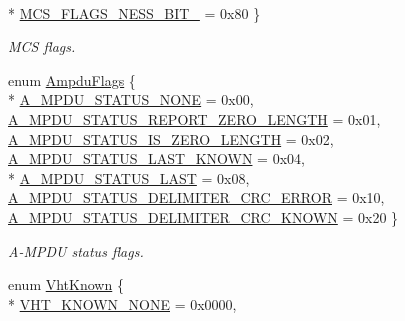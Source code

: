 \begin{DoxyCompactItemize}
\\*
\hyperlink{classns3_1_1RadiotapHeader_a81a58a7c4281df7ce21fb72c5ed181c3a423ea5081ba934fb09932a665e19328e}{M\+C\+S\+\_\+\+F\+L\+A\+G\+S\+\_\+\+N\+E\+S\+S\+\_\+\+B\+I\+T\+\_} = 0x80
 \}\begin{DoxyCompactList}\small\item\em M\+CS flags. \end{DoxyCompactList}
\item 
enum \hyperlink{classns3_1_1RadiotapHeader_a9f8333ba19c8dc9ae63e7e03af87a557}{Ampdu\+Flags} \{ \\*
\hyperlink{classns3_1_1RadiotapHeader_a9f8333ba19c8dc9ae63e7e03af87a557a223cc9f40442a69cce17a841b7c750dc}{A\+\_\+\+M\+P\+D\+U\+\_\+\+S\+T\+A\+T\+U\+S\+\_\+\+N\+O\+NE} = 0x00, 
\hyperlink{classns3_1_1RadiotapHeader_a9f8333ba19c8dc9ae63e7e03af87a557a32af8934a9f8eae371406fe449712487}{A\+\_\+\+M\+P\+D\+U\+\_\+\+S\+T\+A\+T\+U\+S\+\_\+\+R\+E\+P\+O\+R\+T\+\_\+\+Z\+E\+R\+O\+\_\+\+L\+E\+N\+G\+TH} = 0x01, 
\hyperlink{classns3_1_1RadiotapHeader_a9f8333ba19c8dc9ae63e7e03af87a557a0b1a6558b9b8829c7dec7f3dcd223968}{A\+\_\+\+M\+P\+D\+U\+\_\+\+S\+T\+A\+T\+U\+S\+\_\+\+I\+S\+\_\+\+Z\+E\+R\+O\+\_\+\+L\+E\+N\+G\+TH} = 0x02, 
\hyperlink{classns3_1_1RadiotapHeader_a9f8333ba19c8dc9ae63e7e03af87a557ad9c553bb630ebec01fc4cfe8ff68ec9a}{A\+\_\+\+M\+P\+D\+U\+\_\+\+S\+T\+A\+T\+U\+S\+\_\+\+L\+A\+S\+T\+\_\+\+K\+N\+O\+WN} = 0x04, 
\\*
\hyperlink{classns3_1_1RadiotapHeader_a9f8333ba19c8dc9ae63e7e03af87a557ae15e8d17497685bcc4428548af011f1b}{A\+\_\+\+M\+P\+D\+U\+\_\+\+S\+T\+A\+T\+U\+S\+\_\+\+L\+A\+ST} = 0x08, 
\hyperlink{classns3_1_1RadiotapHeader_a9f8333ba19c8dc9ae63e7e03af87a557ad7525ec5c16fe46c765306b3c78d2494}{A\+\_\+\+M\+P\+D\+U\+\_\+\+S\+T\+A\+T\+U\+S\+\_\+\+D\+E\+L\+I\+M\+I\+T\+E\+R\+\_\+\+C\+R\+C\+\_\+\+E\+R\+R\+OR} = 0x10, 
\hyperlink{classns3_1_1RadiotapHeader_a9f8333ba19c8dc9ae63e7e03af87a557abb6bed35bef11dd95a696d65994cf7db}{A\+\_\+\+M\+P\+D\+U\+\_\+\+S\+T\+A\+T\+U\+S\+\_\+\+D\+E\+L\+I\+M\+I\+T\+E\+R\+\_\+\+C\+R\+C\+\_\+\+K\+N\+O\+WN} = 0x20
 \}\begin{DoxyCompactList}\small\item\em A-\/\+M\+P\+DU status flags. \end{DoxyCompactList}
\item 
enum \hyperlink{classns3_1_1RadiotapHeader_a3479bfa57eb27bd6e5eeb2556ab8f5a8}{Vht\+Known} \{ \\*
\hyperlink{classns3_1_1RadiotapHeader_a3479bfa57eb27bd6e5eeb2556ab8f5a8a3fab8c5b84a45f60637048bcf0558753}{V\+H\+T\+\_\+\+K\+N\+O\+W\+N\+\_\+\+N\+O\+NE} = 0x0000, 

\end{DoxyCompactItemize}
